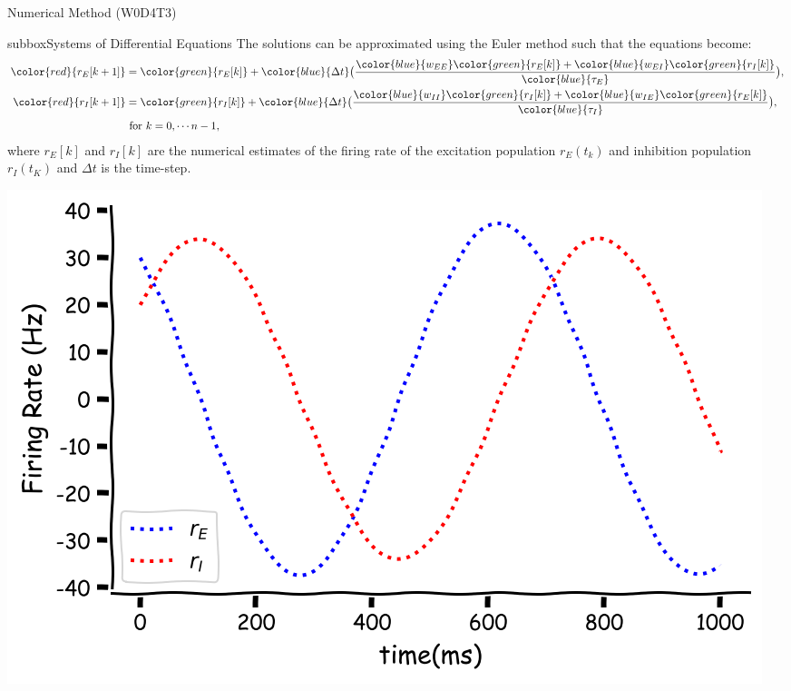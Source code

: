 \begin{multicols}{3}
\begin{textbox}{Numerical Method (W0D4T3)}
\begin{subbox}{subbox}{Systems of Differential Equations}
The solutions can be approximated using the Euler method such that the equations become:
\begin{align*}
\color{red}{r_E[k+1]}&=\color{green}{r_E[k]}+\color{blue}{\Delta t}\big(\frac{\color{blue}{w_{EE}}\color{green}{r_E[k]}+\color{blue}{w_{EI}}\color{green}{r_I[k]}}{\color{blue}{\tau_E}}\big),\\
\color{red}{r_I[k+1]}&=\color{green}{r_I[k]}+\color{blue}{\Delta t}\big(\frac{\color{blue}{w_{II}}\color{green}{r_I[k]}+\color{blue}{w_{IE}}\color{green}{r_E[k]}}{\color{blue}{\tau_I}}\big),\\
&\text{ for } k=0, \cdots n-1,
\end{align*}
where $r_E[k]$ and $r_I[k]$ are the numerical estimates of the firing rate of the excitation population $r_E(t_k)$ and inhibition population $r_I(t_K)$ and $\Delta t$ is the time-step.

\centering
\includegraphics[scale=0.1]{Figures/PreCourse/CFigure9.png}
\end{subbox}
\end{textbox}

\end{multicols}